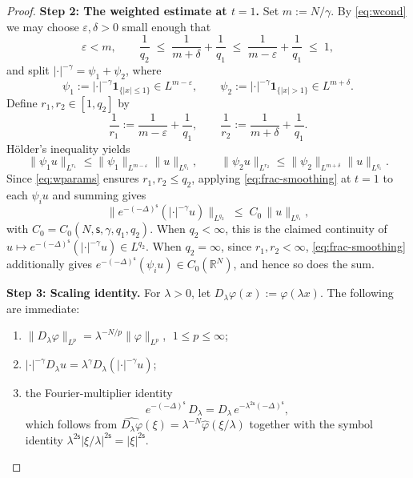 \documentclass[12pt,reqno]{amsart}
\theoremstyle{plain}
\theoremstyle{definition}
\theoremstyle{remark}
\numberwithin{equation}{section}
\newcommand{\ts}{\mathsf{s}}
\begin{document}
\begin{proof}
\medskip
\noindent\textbf{Step 2: The weighted estimate at $t=1$.}
Set $m:=N/\gamma$. By \eqref{eq:wcond} we may choose $\varepsilon,\delta>0$ small enough that
\begin{equation}\label{eq:wparams}
\varepsilon<m,\qquad
\frac{1}{q_{2}}\;\leq\;\frac{1}{m+\delta}+\frac{1}{q_{1}}\;\leq\;\frac{1}{m-\varepsilon}+\frac{1}{q_{1}}\;\leq\;1,
\end{equation}
and split $|\cdot|^{-\gamma}=\psi_{1}+\psi_{2}$, where
\[
\psi_{1}:=|\cdot|^{-\gamma}\mathbf{1}_{\{|x|\leq 1\}}\in L^{m-\varepsilon},\qquad
\psi_{2}:=|\cdot|^{-\gamma}\mathbf{1}_{\{|x|>1\}}\in L^{m+\delta}.
\]
Define $r_{1},r_{2}\in[1,q_{2}]$ by
\[
\frac{1}{r_{1}}:=\frac{1}{m-\varepsilon}+\frac{1}{q_{1}},\qquad
\frac{1}{r_{2}}:=\frac{1}{m+\delta}+\frac{1}{q_{1}}.
\]
H\"older's inequality yields
\[
\|\psi_{1}u\|_{L^{r_{1}}}\leq\|\psi_{1}\|_{L^{m-\varepsilon}}\|u\|_{L^{q_{1}}},
\qquad
\|\psi_{2}u\|_{L^{r_{2}}}\leq\|\psi_{2}\|_{L^{m+\delta}}\|u\|_{L^{q_{1}}}.
\]
Since \eqref{eq:wparams} ensures $r_{1},r_{2}\leq q_{2}$, applying \eqref{eq:frac-smoothing} at $t=1$ to each $\psi_{i}u$ and summing gives
\begin{equation}\label{eq:wt1}
\bigl\|e^{-(-\Delta)^{\ts}}(|\cdot|^{-\gamma}u)\bigr\|_{L^{q_{2}}}
\;\leq\;C_{0}\,\|u\|_{L^{q_{1}}},
\end{equation}
with $C_{0}=C_{0}(N,\ts,\gamma,q_{1},q_{2})$. When $q_{2}<\infty$, this is the claimed continuity of $u\mapsto e^{-(-\Delta)^{\ts}}(|\cdot|^{-\gamma}u)\in L^{q_{2}}$. When $q_{2}=\infty$, since $r_{1},r_{2}<\infty$, \eqref{eq:frac-smoothing} additionally gives $e^{-(-\Delta)^{\ts}}(\psi_{i}u)\in C_{0}(\mathbb{R}^{N})$, and hence so does the sum.

\medskip
\noindent\textbf{Step 3: Scaling identity.}
For $\lambda>0$, let $D_{\lambda}\varphi(x):=\varphi(\lambda x)$. The following are immediate:
\begin{enumerate}[label=(\roman*)]
\item $\|D_{\lambda}\varphi\|_{L^{p}}=\lambda^{-N/p}\|\varphi\|_{L^{p}}$, $\;1\leq p\leq\infty$;
\item $|\cdot|^{-\gamma}D_{\lambda}u=\lambda^{\gamma}D_{\lambda}(|\cdot|^{-\gamma}u)$;
\item the Fourier-multiplier identity
\begin{equation}\label{eq:scaling-semigroup}
e^{-(-\Delta)^{\ts}}\,D_{\lambda}=D_{\lambda}\,e^{-\lambda^{2\ts}(-\Delta)^{\ts}},
\end{equation}
which follows from $\widehat{D_{\lambda}\varphi}(\xi)=\lambda^{-N}\widehat{\varphi}(\xi/\lambda)$ together with the symbol identity $\lambda^{2\ts}|\xi/\lambda|^{2\ts}=|\xi|^{2\ts}$.
\end{enumerate}


\end{proof}
\end{document}
